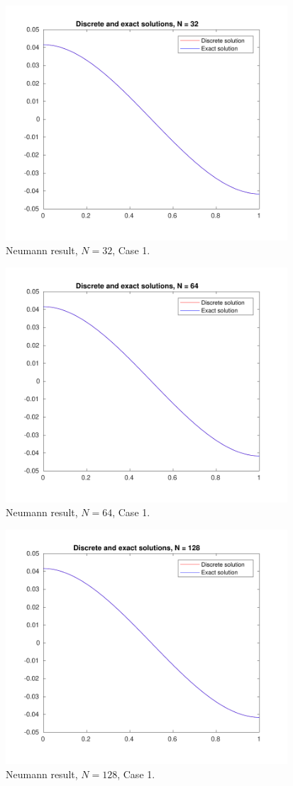 \documentclass[a4paper]{article}
\numberwithin{equation}{section}
\begin{document}
\begin{figure}[H]
\centering\includegraphics[width=10.5cm]{fig_neumann_result_G1_CP1_I1_N32_M6_C1}
\caption{Neumann result, $N=32$, Case 1.}
\end{figure}
\begin{figure}[H]
\centering\includegraphics[width=10.5cm]{fig_neumann_result_G1_CP1_I1_N64_M6_C1}
\caption{Neumann result, $N=64$, Case 1.}
\end{figure}
\begin{figure}[H]
\centering\includegraphics[width=10.5cm]{fig_neumann_result_G1_CP1_I1_N128_M6_C1}
\caption{Neumann result, $N=128$, Case 1.}
\end{figure}
\end{document}
